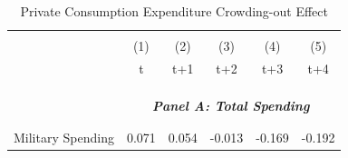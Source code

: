 \documentclass[dv_diss_main.tex]{subfiles}
\begin{document}
\begin{table}[H]
    \begin{center}
    \caption{Private Consumption Expenditure Crowding-out Effect}
    \begin{tabular}{lccccc} \hline
    \vspace{-2pt} & \vspace{-2pt} & \vspace{-2pt} & \vspace{-2pt} & \vspace{-2pt} \\
     & (1) & (2) & (3) & (4) & (5) \\
     & t & t+1 & t+2 & t+3 & t+4 \\ 

    \vspace{-2pt} & \vspace{-2pt} & \vspace{-2pt} & \vspace{-2pt} & \vspace{-2pt} \\\hline
    \vspace{-1.5pt} & \vspace{-1.5pt} & \vspace{-1.5pt} & \vspace{-1.5pt} & \vspace{-1.5pt} \\
    \cmidrule{2-6}
    \vspace{-1.5pt} & \vspace{-1.5pt} & \vspace{-1.5pt} & \vspace{-1.5pt} & \vspace{-1.5pt} \\
    & \multicolumn{5}{c}{\textit{\textbf{Panel A: Total Spending}}} \\ 
    \vspace{-1.5pt} & \vspace{-1.5pt} & \vspace{-1.5pt} & \vspace{-1.5pt} & \vspace{-1.5pt} \\ 
    \cmidrule{2-6}
    \vspace{-1.5pt} & \vspace{-1.5pt} & \vspace{-1.5pt} & \vspace{-1.5pt} & \vspace{-1.5pt}\\
    Military Spending & 0.071 & 0.054 & -0.013 & -0.169 & -0.192 \\

\end{tabular}
\end{center}
\end{table}
\end{document}

